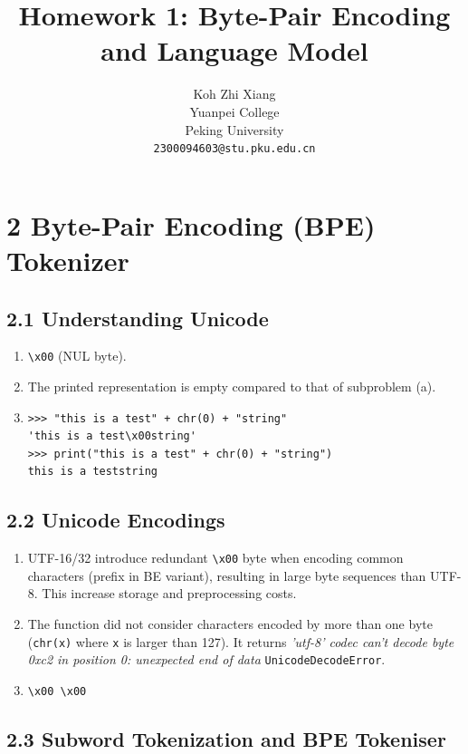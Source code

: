 \documentclass{article}
\title{Homework 1: Byte-Pair Encoding and Language Model}
\author{%
  Koh Zhi Xiang\\
  Yuanpei College\\
  Peking University\\
  \texttt{2300094603@stu.pku.edu.cn} \\
}
\begin{document}
\maketitle

\section*{2 Byte-Pair Encoding (BPE) Tokenizer}
\label{sec:bpe}

\subsection*{2.1 Understanding Unicode}

\begin{enumerate}[label=(\alph*), leftmargin=*]
  \item \texttt{\textbackslash x00} (NUL byte).
  \item The printed representation is empty compared to that of subproblem (a).
  \item
\begin{lstlisting}[style=python]
>>> "this is a test" + chr(0) + "string"
'this is a test\x00string'
>>> print("this is a test" + chr(0) + "string")
this is a teststring
\end{lstlisting}
\end{enumerate}

\subsection*{2.2 Unicode Encodings}

\begin{enumerate}[label=(\alph*), leftmargin=*]
  \item UTF-16/32 introduce redundant \texttt{\textbackslash x00} byte when encoding common characters (prefix in BE variant), resulting in large byte sequences than UTF-8. This increase storage and preprocessing costs.
  \item The function did not consider characters encoded by more than one byte (\texttt{chr(x)} where \texttt{x} is larger than 127). It returns \textit{'utf-8' codec can't decode byte 0xc2 in position 0: unexpected end of data} \texttt{UnicodeDecodeError}.
  \item \texttt{\textbackslash x00 \textbackslash x00}
\end{enumerate}

\subsection*{2.3 Subword Tokenization and BPE Tokeniser}
\end{document}
